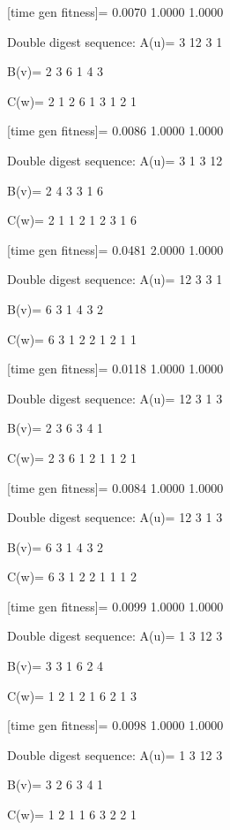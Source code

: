[time gen fitness]=
    0.0070    1.0000    1.0000

Double digest sequence:
A(u)=
     3    12     3     1

B(v)=
     2     3     6     1     4     3

C(w)=
     2     1     2     6     1     3     1     2     1

[time gen fitness]=
    0.0086    1.0000    1.0000

Double digest sequence:
A(u)=
     3     1     3    12

B(v)=
     2     4     3     3     1     6

C(w)=
     2     1     1     2     1     2     3     1     6

[time gen fitness]=
    0.0481    2.0000    1.0000

Double digest sequence:
A(u)=
    12     3     3     1

B(v)=
     6     3     1     4     3     2

C(w)=
     6     3     1     2     2     1     2     1     1

[time gen fitness]=
    0.0118    1.0000    1.0000

Double digest sequence:
A(u)=
    12     3     1     3

B(v)=
     2     3     6     3     4     1

C(w)=
     2     3     6     1     2     1     1     2     1

[time gen fitness]=
    0.0084    1.0000    1.0000

Double digest sequence:
A(u)=
    12     3     1     3

B(v)=
     6     3     1     4     3     2

C(w)=
     6     3     1     2     2     1     1     1     2

[time gen fitness]=
    0.0099    1.0000    1.0000

Double digest sequence:
A(u)=
     1     3    12     3

B(v)=
     3     3     1     6     2     4

C(w)=
     1     2     1     2     1     6     2     1     3

[time gen fitness]=
    0.0098    1.0000    1.0000

Double digest sequence:
A(u)=
     1     3    12     3

B(v)=
     3     2     6     3     4     1

C(w)=
     1     2     1     1     6     3     2     2     1

